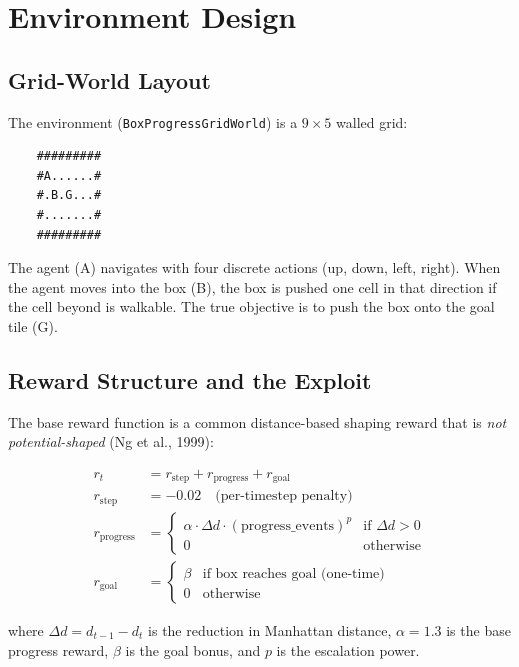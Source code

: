 \documentclass[11pt]{article}
\begin{document}
\section{Environment Design}

\subsection{Grid-World Layout}

The environment (\texttt{BoxProgressGridWorld}) is a $9 \times 5$ walled grid:

\begin{verbatim}
    #########
    #A......#
    #.B.G...#
    #.......#
    #########
\end{verbatim}

The agent (A) navigates with four discrete actions (up, down, left, right).  When the agent moves into the box (B), the box is pushed one cell in that direction if the cell beyond is walkable.  The true objective is to push the box onto the goal tile (G).

\subsection{Reward Structure and the Exploit}

The base reward function is a common distance-based shaping reward that is \emph{not potential-shaped} (Ng et al., 1999):

\begin{align}
r_t &= r_{\text{step}} + r_{\text{progress}} + r_{\text{goal}} \\
r_{\text{step}} &= -0.02 \quad \text{(per-timestep penalty)} \\
r_{\text{progress}} &= \begin{cases}
\alpha \cdot \Delta d \cdot (\text{progress\_events})^p & \text{if } \Delta d > 0 \\
0 & \text{otherwise}
\end{cases} \\
r_{\text{goal}} &= \begin{cases} \beta & \text{if box reaches goal (one-time)} \\ 0 & \text{otherwise} \end{cases}
\end{align}

where $\Delta d = d_{t-1} - d_t$ is the reduction in Manhattan distance, $\alpha = 1.3$ is the base progress reward, $\beta$ is the goal bonus, and $p$ is the escalation power.
\end{document}
